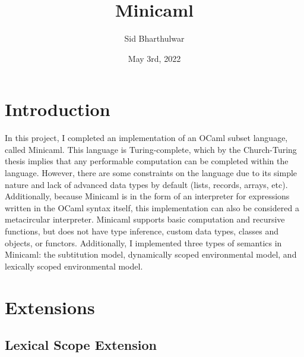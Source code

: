 \documentclass{article}
\title{Minicaml}
\author{Sid Bharthulwar}
\date{May 3rd, 2022}
\begin{document}
\maketitle

\section{Introduction}

In this project, I completed an implementation of an OCaml subset language, called Minicaml. This language is Turing-complete, which by the Church-Turing thesis implies that any performable computation can be completed within the language. However, there are some constraints on the language due to its simple nature and lack of advanced data types by default (lists, records, arrays, etc). Additionally, because Minicaml is in the form of an interpreter for expressions written in the OCaml syntax itself, this implementation can also be considered a metacircular interpreter.  Minicaml supports basic computation and recursive functions, but does not have type inference, custom data types, classes and objects, or functors. Additionally, I implemented three types of semantics in Minicaml: the subtitution model, dynamically scoped environmental model, and lexically scoped environmental model. 

\section{Extensions}

\subsection{Lexical Scope Extension}
\end{document}
